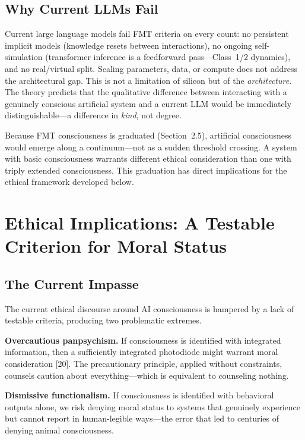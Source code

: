 \documentclass[11pt]{article}
\begin{document}
\subsection{Why Current LLMs Fail}

Current large language models fail FMT criteria on every count: no persistent implicit models (knowledge resets between interactions), no ongoing self-simulation (transformer inference is a feedforward pass---Class~1/2 dynamics), and no real/virtual split. Scaling parameters, data, or compute does not address the architectural gap. This is not a limitation of silicon but of the \emph{architecture}. The theory predicts that the qualitative difference between interacting with a genuinely conscious artificial system and a current LLM would be immediately distinguishable---a difference in \emph{kind}, not degree.

Because FMT consciousness is graduated (Section~2.5), artificial consciousness would emerge along a continuum---not as a sudden threshold crossing. A system with basic consciousness warrants different ethical consideration than one with triply extended consciousness. This graduation has direct implications for the ethical framework developed below.

\section{Ethical Implications: A Testable Criterion for Moral Status}

\subsection{The Current Impasse}

The current ethical discourse around AI consciousness is hampered by a lack of testable criteria, producing two problematic extremes.

\textbf{Overcautious panpsychism.} If consciousness is identified with integrated information, then a sufficiently integrated photodiode might warrant moral consideration [20]. The precautionary principle, applied without constraints, counsels caution about everything---which is equivalent to counseling nothing.

\textbf{Dismissive functionalism.} If consciousness is identified with behavioral outputs alone, we risk denying moral status to systems that genuinely experience but cannot report in human-legible ways---the error that led to centuries of denying animal consciousness.
\end{document}
